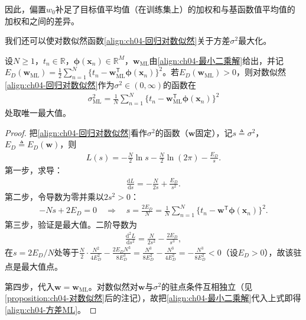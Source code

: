 \documentclass[../../main.tex]{subfiles}
\begin{document}
因此，偏置$w_0$补足了目标值平均值（在训练集上）的加权和与基函数值平均值的加权和之间的差异。

我们还可以使对数似然函数\eqref{align:ch04-回归对数似然}关于方差$\sigma^2$最大化。

\begin{proposition}[方差的最大似然解]\label{proposition:ch04-方差最大似然}
设$N\geqslant1$，$t_n\in\mathbb{R}$，$\boldsymbol{\phi}(\boldsymbol{x}_n)\in\mathbb{R}^{M}$，$\boldsymbol{w}_{\mathrm{ML}}$由\eqref{align:ch04-最小二乘解}给出，并记$E_D(\boldsymbol{w}_{\mathrm{ML}})=\frac{1}{2}\sum_{n=1}^{N}\{t_n-\boldsymbol{w}_{\mathrm{ML}}^{\mathsf{T}}\boldsymbol{\phi}(\boldsymbol{x}_n)\}^{2}$。若$E_D(\boldsymbol{w}_{\mathrm{ML}})>0$，则对数似然\eqref{align:ch04-回归对数似然}作为$\sigma^{2}\in(0,\infty)$的函数在
\begin{align}
  \sigma^2_{\mathrm{ML}}=\frac{1}{N}\sum_{n=1}^{N}\bigl\{t_n-\boldsymbol{w}_{\mathrm{ML}}^{\mathsf{T}}\boldsymbol{\phi}(\boldsymbol{x}_n)\bigr\}^2
  \label{align:ch04-方差ML}
\end{align}
处取唯一最大值。
\end{proposition}

\begin{proof}
把\eqref{align:ch04-回归对数似然}看作$\sigma^2$的函数（$\boldsymbol{w}$固定），记$s\triangleq\sigma^2$，$E_D\triangleq E_D(\boldsymbol{w})$，则
\begin{align*}
  L(s)=-\frac{N}{2}\ln s-\frac{N}{2}\ln(2\pi)-\frac{E_D}{s}.
\end{align*}
第一步，求导：
\begin{align*}
  \frac{\mathrm{d}L}{\mathrm{d}s}=-\frac{N}{2s}+\frac{E_D}{s^2}.
\end{align*}
第二步，令导数为零并乘以$2s^2>0$：
\begin{align*}
  -Ns+2E_D=0\quad\Longrightarrow\quad s=\frac{2E_D}{N}
  =\frac{1}{N}\sum_{n=1}^{N}\bigl\{t_n-\boldsymbol{w}^{\mathsf{T}}\boldsymbol{\phi}(\boldsymbol{x}_n)\bigr\}^2 .
\end{align*}
第三步，验证是最大值。二阶导数为
\begin{align*}
  \frac{\mathrm{d}^2L}{\mathrm{d}s^2}=\frac{N}{2s^2}-\frac{2E_D}{s^3},
\end{align*}
在$s=2E_D/N$处等于$\frac{N}{2}\cdot\frac{N^2}{4E_D^2}-\frac{2E_DN^3}{8E_D^3}=\frac{N^3}{8E_D^2}-\frac{N^3}{4E_D^2}=-\frac{N^3}{8E_D^2}<0$（设$E_D>0$），故该驻点是最大值点。

第四步，代入$\boldsymbol{w}=\boldsymbol{w}_{\mathrm{ML}}$。对数似然对$\boldsymbol{w}$与$\sigma^2$的驻点条件互相独立（见\cref{proposition:ch04-对数似然}后的注记），故把\eqref{align:ch04-最小二乘解}代入上式即得\eqref{align:ch04-方差ML}。
\end{proof}
\end{document}
